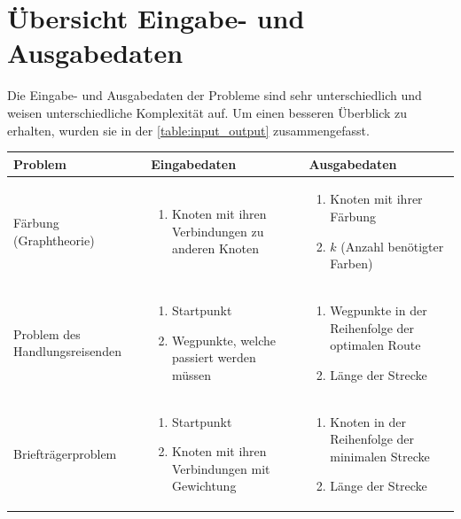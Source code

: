 \newpage
\section{Übersicht Eingabe- und Ausgabedaten \resultAssignment{[R2]}}\label{overview_input_output}
Die Eingabe- und Ausgabedaten der Probleme sind sehr unterschiedlich und weisen unterschiedliche Komplexität auf. Um einen besseren Überblick zu erhalten, wurden sie in der 
\autoref{table:input_output} zusammengefasst.
\begin{table}[ht]
\centering
  \begin{tabular}{ p{3cm} | p{5.4cm} | p{5.4cm} }
	\hline
	\rowcolor{gray}
	\textbf{Problem}				& \textbf{Eingabedaten}								& \textbf{Ausgabedaten}\\ \hline
	Färbung (Graphtheorie)			& \begin{enumerate}
								\item Knoten mit ihren Verbindungen zu anderen Knoten
							   \end{enumerate}				
							&  \begin{enumerate}
								\item Knoten mit ihrer Färbung
								\item $k$ (Anzahl benötigter Farben)
							   \end{enumerate}	\\ \hline
	Problem des Handlungsreisenden		& \begin{enumerate}
								\item Startpunkt
								\item Wegpunkte, welche passiert werden müssen
							   \end{enumerate}				
							&  \begin{enumerate}
								\item Wegpunkte in der Reihenfolge der optimalen Route
								\item Länge der Strecke
							   \end{enumerate}	\\ \hline
	Briefträgerproblem	 			& \begin{enumerate}
								\item Startpunkt
								\item Knoten mit ihren Verbindungen mit Gewichtung
							   \end{enumerate}				
							&  \begin{enumerate}
								\item Knoten in der Reihenfolge der minimalen Strecke
								\item Länge der Strecke

\end{enumerate}
\end{tabular}
\end{table}
